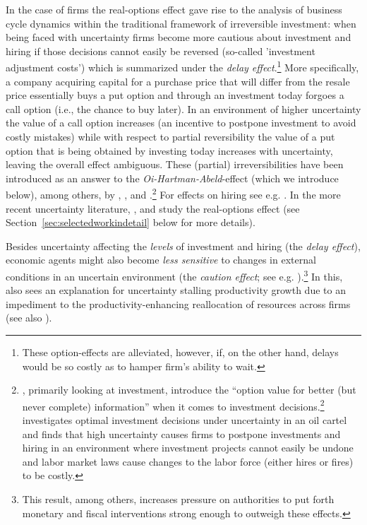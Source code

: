 \documentclass[a4paper,11pt,listof=nochaptergap,oneside,pointednumbers,bibtotoc,bigheadings,liststotoc,hidelinks]{scrbook}
\theoremstyle{mysatz}
\theoremstyle{mydefinition}
\theoremstyle{mytheorem}
\theoremstyle{mybemerkung}
\begin{document}
In the case of firms the real-options effect gave rise to the analysis of business cycle dynamics within the traditional framework of irreversible investment: when being faced with uncertainty firms become more cautious about investment and hiring if those decisions cannot easily be reversed (so-called 'investment adjustment costs') which is summarized under the \textit{delay effect}.\footnote{These option-effects are alleviated, however, if, on the other hand, delays would be so costly as to hamper firm's ability to wait.} More specifically, a company acquiring capital for a purchase price that will differ from the resale price essentially buys a put option and through an investment today forgoes a call option (i.e., the chance to buy later). In an environment of higher uncertainty the value of a call option increases (an incentive to postpone investment to avoid costly mistakes) while with respect to partial reversibility the value of a put option that is being obtained by investing today increases with uncertainty, leaving the overall effect ambiguous. These (partial) irreversibilities have been introduced as an answer to the \textit{Oi-Hartman-Abeld}-effect (which we introduce below), among others, by \citet{dixitandpindyck:94}, \citet{bernanke:83}, \citet{abelandeberly:96} and \citet{siegel:86}.\footnote{\citet{dixitandpindyck:94}, primarily looking at investment, introduce the ``option value for better (but never complete) information'' when it comes to investment decisions.\footnote{In fact, the term 'options-effect' in this context borrows from an analogy of option theory in finance.} \citet{bernanke:83} investigates optimal investment decisions under uncertainty in an oil cartel and finds that high uncertainty causes firms to postpone investments and hiring in an environment where investment projects cannot easily be undone and labor market laws cause changes to the labor force (either hires or fires) to be costly.} For effects on hiring see e.g. \citet{bentoliliaandbertola:90} . In the more recent uncertainty literature, \citet{bloom:09}, \citet{bloometal:12} and \citet{schaal:17} study the real-options effect (see Section~\ref{sec:selectedworkindetail} below for more details).

Besides uncertainty affecting the \textit{levels} of investment and hiring (the \textit{delay effect}), economic agents might also become \textit{less sensitive} to changes in external conditions in an uncertain environment (the \textit{caution effect}; see e.g. \citealp{bloom:09}).\footnote{This result, among others, increases pressure on authorities to put forth monetary and fiscal interventions strong enough to outweigh these effects.} In this, \citet{bloom:14} also sees an explanation for uncertainty stalling productivity growth due to an impediment to the productivity-enhancing reallocation of resources across firms (see also \citealp{bloometal:12}).\\
\end{document}
